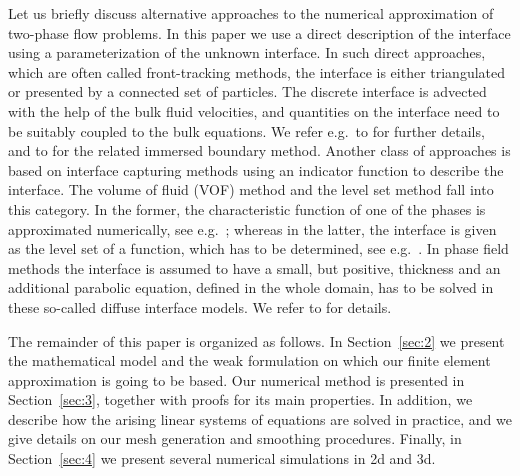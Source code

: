 \documentclass[a4paper,12pt,onecolumn]{article}
\begin{document}
Let us briefly discuss alternative approaches to the numerical approximation of two-phase flow problems. In this paper we use a direct description of the interface using a parameterization of the unknown interface. In such direct approaches, which are often called front-tracking methods, the interface is either triangulated or presented by a connected set of particles. The discrete interface is advected with the help of the bulk fluid velocities, and quantities on the interface need to be suitably coupled to the bulk equations. We refer e.g.\ to 
\cite{UnverdiT92,Bansch01,Tryggvason_etal01,GanesanMT07,GanesanT08,spurious} for further details, and to \cite{LevequeL97,Peskin02} for the
related immersed boundary method. Another class of approaches is based on interface capturing methods using an indicator function to
describe the interface. The volume of fluid (VOF) method and the level set  method fall into this category. In the former, the characteristic function of one of the phases is approximated numerically, see e.g.\ \cite{HirtN81,RenardyR02,Popinet09}; whereas in the latter, the interface is given as the level set of a function, which has to be determined, see e.g.\ \cite{SussmanSO94,Sethian99,OsherF03,GrossR07}. 
In phase field methods the interface is assumed to have a small, but positive, thickness and an additional parabolic equation, defined in the whole domain, has to be solved in these so-called diffuse interface models. We refer to \cite{HohenbergH77,AndersonMW98,LowengrubT98,Feng06,KaySW08,AbelsGG12,GrunK14} for details.

The remainder of this paper is organized as follows. In Section~\ref{sec:2} we present the mathematical model and the weak formulation on which our finite element approximation is going to be based. Our numerical method is presented in Section~\ref{sec:3}, together with proofs for its main properties. In addition, we describe how the arising linear systems of equations are solved in practice, and we give details on our mesh generation and smoothing procedures. Finally, in Section~\ref{sec:4} we present several numerical simulations in 2d and 3d.
\end{document}
